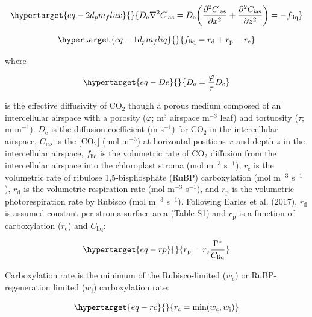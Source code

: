 \documentclass[
  letterpaper,
  DIV=11,
  numbers=noendperiod]{scrartcl}
\begin{document}
\begin{equation}\protect\hypertarget{eq-2d_pm_flux}{}{D_\text{e} \nabla^2 C_\text{ias} = D_\text{e} \bigg(\frac{\partial^2 C_\text{ias}}{\partial x^2} + \frac{\partial^2 C_\text{ias}}{\partial z^2}\bigg) = -f_\text{liq}}\label{eq-2d_pm_flux}\end{equation}

\begin{equation}\protect\hypertarget{eq-1d_pm_fliq}{}{f_\text{liq} = r_\text{d} + r_\text{p} - r_\text{c}}\label{eq-1d_pm_fliq}\end{equation}

where

\begin{equation}\protect\hypertarget{eq-De}{}{
D_\text{e} = \frac{\varphi}{\tau} D_\text{c}
}\label{eq-De}\end{equation}

is the effective diffusivity of CO\(_2\) though a porous medium composed
of an intercellular airspace with a porosity (\(\varphi\); m\(^3\)
airspace m\(^{-3}\) leaf) and tortuosity (\(\tau\); m m\(^{-1}\)).
\(D_\text{c}\) is the diffusion coefficient (m s\(^{-1}\)) for CO\(_2\)
in the intercellular airspace, \(C_\text{ias}\) is the {[}CO\(_2\){]}
(mol m\(^{-3}\)) at horizontal positions \(x\) and depth \(z\) in the
intercellular airspace, \(f_\text{liq}\) is the volumetric rate of
CO\(_2\) diffusion from the intercellular airspace into the chloroplast
stroma (mol m\(^{-3}\) s\(^{-1}\)), \(r_\text{c}\) is the volumetric
rate of ribulose 1,5-bisphosphate (RuBP) carboxylation (mol m\(^{-3}\)
s\(^{-1}\)), \(r_\text{d}\) is the volumetric respiration rate (mol
m\(^{-3}\) s\(^{-1}\)), and \(r_\text{p}\) is the volumetric
photorespiration rate by Rubisco (mol m\(^{-3}\) s\(^{-1}\)). Following
Earles et al. (2017), \(r_\text{d}\) is assumed constant per stroma
surface area (Table S1) and \(r_\text{p}\) is a function of
carboxylation (\(r_\text{c}\)) and \(C_\text{liq}\):

\begin{equation}\protect\hypertarget{eq-rp}{}{ r_\text{p} = r_\text{c} \frac{\Gamma^*}{C_\text{liq}} }\label{eq-rp}\end{equation}

Carboxylation rate is the minimum of the Rubisco-limited
(\(w_\text{c}\)) or RuBP-regeneration limited (\(w_\text{j}\))
carboxylation rate:

\begin{equation}\protect\hypertarget{eq-rc}{}{ r_\text{c} = \text{min}(w_\text{c}, w_\text{j}) }\label{eq-rc}\end{equation}
\end{document}
